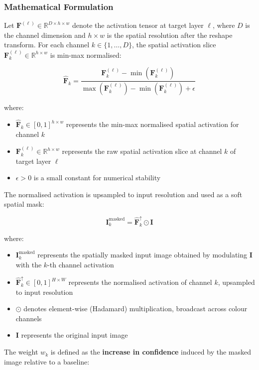 \subsubsection{Mathematical Formulation}

Let $\mathbf{F}^{(\ell)} \in \mathbb{R}^{D \times h \times w}$ denote the activation tensor at target layer $\ell$, where $D$ is the channel dimension and $h \times w$ is the spatial resolution after the reshape transform. For each channel $k \in \{1, \ldots, D\}$, the spatial activation slice $\mathbf{F}_k^{(\ell)} \in \mathbb{R}^{h \times w}$ is min-max normalised:

\[
\hat{\mathbf{F}}_k = \frac{\mathbf{F}_k^{(\ell)} - \min(\mathbf{F}_k^{(\ell)})}{\max(\mathbf{F}_k^{(\ell)}) - \min(\mathbf{F}_k^{(\ell)}) + \epsilon}
\]

where:
\begin{itemize}
\item $\hat{\mathbf{F}}_k \in [0,1]^{h \times w}$ represents the min-max normalised spatial activation for channel $k$
\item $\mathbf{F}_k^{(\ell)} \in \mathbb{R}^{h \times w}$ represents the raw spatial activation slice at channel $k$ of target layer $\ell$
\item $\epsilon > 0$ is a small constant for numerical stability
\end{itemize}

The normalised activation is upsampled to input resolution and used as a soft spatial mask:

\[
\mathbf{I}_k^{\text{masked}} = \hat{\mathbf{F}}_k^{\uparrow} \odot \mathbf{I}
\]

where:
\begin{itemize}
\item $\mathbf{I}_k^{\text{masked}}$ represents the spatially masked input image obtained by modulating $\mathbf{I}$ with the $k$-th channel activation
\item $\hat{\mathbf{F}}_k^{\uparrow} \in [0,1]^{H \times W}$ represents the normalised activation of channel $k$, upsampled to input resolution
\item $\odot$ denotes element-wise (Hadamard) multiplication, broadcast across colour channels
\item $\mathbf{I}$ represents the original input image
\end{itemize}

The weight $w_k$ is defined as the \textbf{increase in confidence} induced by the masked image relative to a baseline:

